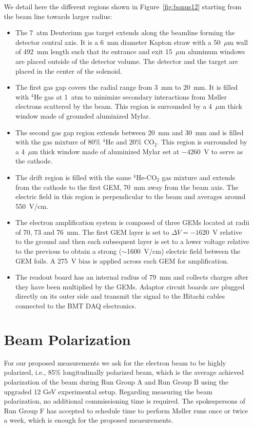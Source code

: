 We detail here the different regions shown in Figure~\ref{fig:bonus12} starting 
from the beam line towards larger radius:\\
\begin{itemize}
  \item The 7~atm Deuterium gas target extends along the beamline forming the 
     detector central axis. It is a 6~mm diameter Kapton straw with a 50~$\mu$m 
      wall of 492~mm length such that its entrance and exit 15~$\mu$m aluminum 
      windows are placed outside of the detector volume.  The detector and the 
      target are placed in the center of the solenoid.
   \item The first gas gap covers the radial range from 3~mm to 20~mm. It is 
      filled with $^{4}$He gas at 1~atm to minimize secondary interactions from
      M\o{}ller electrons scattered by the beam. This region is surrounded by a 
      4~$\mu$m thick window made of grounded aluminized Mylar.
   \item The second gas gap region extends between 20~mm and 30~mm and is 
      filled with the gas mixture of 80$\%$ $^{4}$He and 20$\%$ CO$_2$. This 
      region is surrounded by a 4~$\mu$m thick window made of aluminized Mylar 
      set at $-4260$~V to serve as the cathode.
   \item The drift region is filled with the same $^4$He-CO$_2$ gas mixture and 
      extends from the cathode to the first GEM, 70~mm away from the beam axis.  
      The electric field in this region is perpendicular to the beam and 
      averages around 550~V/cm.
   \item The electron amplification system is composed of three GEMs located at 
      radii of 70, 73 and 76~mm. The first GEM layer is set to $\Delta 
      V=-1620$~V relative to the ground and then each subsequent layer is set 
      to a lower voltage relative to the previous to obtain a strong 
      ($\sim$1600~V/cm) electric field between the GEM foils. A 275~V bias is 
      applied across each GEM for amplification.
   \item The readout board has an internal radius of 79~mm and collects charges 
      after they have been multiplied by the GEMs. Adaptor circuit boards are 
      plugged directly on its outer side and transmit the signal to the Hitachi 
      cables connected to the BMT DAQ electronics.
\end{itemize}



\section{Beam Polarization}
For our proposed measurements we ask for the electron beam to be highly 
polarized, i.e., 85\% longitudinally polarized beam, which is the average 
achieved polarization of the beam during Run Group A and Run Group B using the 
upgraded 12 GeV experimental setup. Regarding measuring the beam polarization, 
no additional commissioning time is required. The spokespersons of Run Group F 
\cite{skuhn} has accepted to schedule time to perform M{\o}ller runs once or 
twice a week, which is enough for the proposed measurements.    

